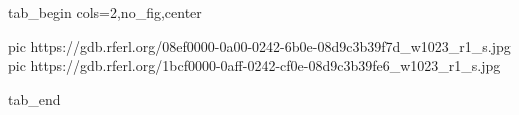  
 
 
 
 

\ifcmt
  tab_begin cols=2,no_fig,center

     pic https://gdb.rferl.org/08ef0000-0a00-0242-6b0e-08d9c3b39f7d_w1023_r1_s.jpg
		 pic https://gdb.rferl.org/1bcf0000-0aff-0242-cf0e-08d9c3b39fe6_w1023_r1_s.jpg

  tab_end
\fi
